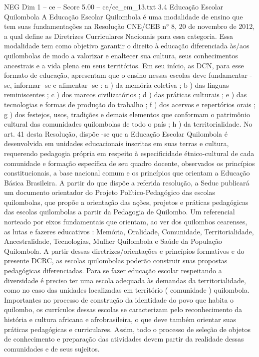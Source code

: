 \begin{textsample}{NEG Dim 1 – ce – Score 5.00 – ce/ce\_em\_13.txt}  \label{ex:f1_neg_242}
3.4 Educação Escolar Quilombola A Educação Escolar Quilombola é uma modalidade de ensino que tem suas fundamentações na Resolução CNE/CEB n{\EmojiFont °} 8, 20 de novembro de 2012, a qual define as Diretrizes Curriculares Nacionais para essa categoria.
Essa modalidade tem como objetivo garantir o direito à educação diferenciada às/aos quilombolas de modo a valorizar e enaltecer sua cultura, seus conhecimentos ancestrais e a vida plena em seus territórios.
Em seu início, as DCN, para esse formato de educação, apresentam que o ensino nessas escolas deve fundamentar -se, informar -se e alimentar -se : a ) da memória coletiva ; b ) das línguas reminiscentes ; c ) dos marcos civilizatórios ; d ) das práticas culturais ; e ) das tecnologias e formas de produção do trabalho ; f ) dos acervos e repertórios orais ; g ) dos festejos, usos, tradições e demais elementos que conformam o patrimônio cultural das comunidades quilombolas de todo o país ; h ) da territorialidade.
No art. 41 desta Resolução, dispõe -se que a Educação Escolar Quilombola é desenvolvida em unidades educacionais inscritas em suas terras e cultura, requerendo pedagogia própria em respeito à especificidade étnico-cultural de cada comunidade e formação específica de seu quadro docente, observados os princípios constitucionais, a base nacional comum e os princípios que orientam a Educação Básica Brasileira.
A partir do que dispõe a referida resolução, a Seduc publicará um documento orientador do Projeto Político-Pedagógico das escolas quilombolas, que propõe a orientação das ações, projetos e práticas pedagógicas das escolas quilombolas a partir da Pedagogia de Quilombo.
Um referencial norteado por eixos fundamentais que orientam, ao ver dos quilombos cearenses, as lutas e fazeres educativos : Memória, Oralidade, Comunidade, Territorialidade, Ancestralidade, Tecnologias, Mulher Quilombola e Saúde da População Quilombola.
A partir dessas diretrizes/orientações e princípios formativos e do presente DCRC, as escolas quilombolas poderão construir suas propostas pedagógicas diferenciadas.
Para se fazer educação escolar respeitando a diversidade é preciso ter uma escola adequada às demandas da territorialidade, como no caso das unidades localizadas em território ( comunidade ) quilombola.
Importantes no processo de construção da identidade do povo que habita o quilombo, os currículos dessas escolas se caracterizam pelo reconhecimento da história e cultura africana e afrobrasileira, o que deve também orientar suas práticas pedagógicas e curriculares.
Assim, todo o processo de seleção de objetos de conhecimento e preparação das atividades devem partir da realidade dessas comunidades e de seus sujeitos.

\end{textsample}
